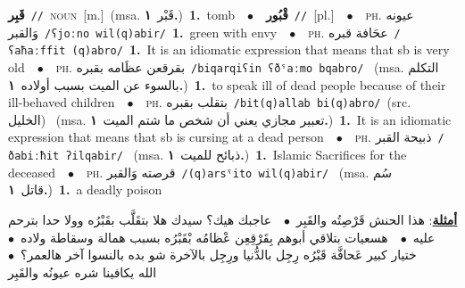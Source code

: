 \documentclass[10pt,a4paper,twoside]{article} %
\begin{document}
\begin{multicols}{2}
{{{{{\setlength\topsep{0pt}\textbf{\foreignlanguage{arabic}{قَبِر}}\ {\color{gray}\texttt{//}\color{black}}\ \textsc{noun}\ [m.]\ \color{gray}(msa. \foreignlanguage{arabic}{قَبْر}~\foreignlanguage{arabic}{\textbf{١.}})\color{black}\ \textbf{1.}~tomb\ \ $\bullet$\ \ \setlength\topsep{0pt}\textbf{\foreignlanguage{arabic}{قْبُور}}\ {\color{gray}\texttt{//}\color{black}}\ [pl.]\ \ $\bullet$\ \ \textsc{ph.} \color{gray} \foreignlanguage{arabic}{عيونه وَالقبر}\color{black}\ {\color{gray}\texttt{/{\sffamily ʕjoːno wil(q)abir}/}\color{black}}\ \textbf{1.}~green with envy\ \ $\bullet$\ \ \textsc{ph.} \color{gray} \foreignlanguage{arabic}{عحَافة قبره}\color{black}\ {\color{gray}\texttt{/{\sffamily ʕaħaːffit (q)abro}/}\color{black}}\ \textbf{1.}~It is an idiomatic expression that means that sb is very old\ \ $\bullet$\ \ \textsc{ph.} \color{gray} \foreignlanguage{arabic}{بقرقعن عظَامه بقبره}\color{black}\ {\color{gray}\texttt{/{\sffamily biqarqiʕin ʕðˤaːmo bqabro}/}\color{black}}\ \color{gray} (msa. \foreignlanguage{arabic}{التكلم بالسوء عن الميت بسبب أولاده}~\foreignlanguage{arabic}{\textbf{١.}})\color{black}\ \textbf{1.}~to speak ill of dead people because of their ill-behaved children\ \ $\bullet$\ \ \textsc{ph.} \color{gray} \foreignlanguage{arabic}{بتقلب بقبره}\color{black}\ {\color{gray}\texttt{/{\sffamily bit(q)allab bi(q)abro}/}\color{black}}\ \color{gray}(src. \foreignlanguage{arabic}{الخليل})\color{black}\ \color{gray} (msa. \foreignlanguage{arabic}{تعبير مجازي يعني أن شخص ما شتم الميت}~\foreignlanguage{arabic}{\textbf{١.}})\color{black}\ \textbf{1.}~It is an idiomatic expression that means that sb is cursing at a dead person\ \ $\bullet$\ \ \textsc{ph.} \color{gray} \foreignlanguage{arabic}{ذبيحة القبر}\color{black}\ {\color{gray}\texttt{/{\sffamily ðabiːħit ʔilqabir}/}\color{black}}\ \color{gray} (msa. \foreignlanguage{arabic}{ذبائح للميت}~\foreignlanguage{arabic}{\textbf{١.}})\color{black}\ \textbf{1.}~Islamic Sacrifices for the deceased\ \ $\bullet$\ \ \textsc{ph.} \color{gray} \foreignlanguage{arabic}{قرصته وَالقبر}\color{black}\ {\color{gray}\texttt{/{\sffamily (q)arsˤito wil(q)abir}/}\color{black}}\ \color{gray} (msa. \foreignlanguage{arabic}{سُم قاتل}~\foreignlanguage{arabic}{\textbf{١.}})\color{black}\ \textbf{1.}~a deadly poison\  \begin{flushright}\color{gray}\foreignlanguage{arabic}{\textbf{\underline{\foreignlanguage{arabic}{أمثلة}}}: هذا الحنش قَرْصِتُه والقَبِر\ $\bullet$\ \  عاجبك هيك؟ سيدك هلا بتقَلَّب بقَبْرُه وولا حدا بترحم عليه\ $\bullet$\ \  هسعيات بتلاقي أبوهم بِقَرْقِعِن عْظامُه بْقَبْرُه بسبب همالة وسقاطة ولاده\ $\bullet$\ \  ختيار كبير عَحافَّة قَبْرُه رِجِل بالدُّنيا ورِجِل بالآخرة شو بده بالنسوا آخر هالعمر؟\ $\bullet$\ \  الله يكافينا شره عيونُه والقَبِر}\end{flushright}\color{black}} \vspace{2mm}

}}}}
\end{multicols}
\end{document}

